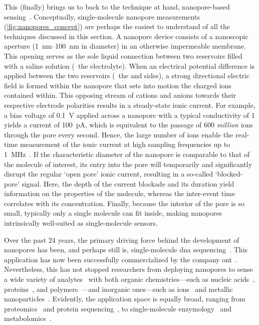 This (finally) brings us to back to the technique at hand, nanopore-based
sensing~\cite{Howorka-2009,Wang-2018}. Conceptually, single-molecule nanopore measurements
(\cref{fig:nanopores_concept}) are perhaps the easiest to understand of all the techniques discussed in this
section. A nanopore device consists of a nanoscopic aperture (\SIrange{1}{100}{\nm} in diameter) in an
otherwise impermeable membrane. This opening serves as the sole liquid connection between two reservoirs
filled with a saline solution (\ie~the electrolyte). When an electrical potential difference is applied
between the two reservoirs (\ie~the \cisi{} and \transi{} sides), a strong directional electric field is
formed within the nanopore that sets into motion the charged ions contained within. This opposing stream of
cations and anions towards their respective electrode polarities results in a steady-state ionic current. For
example, a bias voltage of \SI{0.1}{\volt} applied across a nanopore with a typical conductivity of
\SI{1}{\nS} yields a current of \SI{100}{\pA}, which is equivalent to the passage of \num{600} \emph{million}
ions through the pore every second. Hence, the large number of ions enable the real-time measurement of the
ionic current at high sampling frequencies up to \SI{1}{\mega\hertz}~\cite{Rosenstein-2012}. If the
characteristic diameter of the nanopore is comparable to that of the molecule of interest, its entry into the
pore will temporarily and significantly disrupt the regular `open pore' ionic current, resulting in a
so-called `blocked-pore' signal. Here, the depth of the current blockade and its duration yield information on
the properties of the molecule, whereas the inter-event time correlates with its concentration. Finally,
because the interior of the pore is so small, typically only a single molecule can fit inside, making
nanopores intrinsically well-suited as single-molecule sensors.

Over the past 24 years, the primary driving force behind the development of nanopores has been, and perhaps
still is, single-molecule \gls{dna} sequencing~\cite{Deamer-2016}. This application has now been successfully
commercialized by the company \gls{ont}~\cite{ONT-2020,Jain-2018}. Nevertheless, this has not stopped
researchers from deploying nanopores to sense a wide variety of analytes~\cite{Wang-2018} with both organic
chemistries---such as nucleic acids~\cite{Kasianowicz-1996,Meller-2000,Stoddart-2009,Manrao-2012},
proteins~\cite{Mohammad-2008,Firnkes-2010,Spiering-2011,RodriguezLarrea-2013}, and
polymers~\cite{Robertson-2007,Baaken-2011}---and inorganic ones---such as
ions~\cite{Bezrukov-1993,Kasianowicz-1995,Kasianowicz-1999,Ali-2011,Roozbahani-2020} and metallic
nanoparticles~\cite{Astier-2009,Angevine-2014,Campos-2018}. Evidently, the application space is equally broad,
ranging from proteomics~\cite{Yusko-2017,Houghtaling-2019} and protein
sequencing~\cite{Restrepo-Perez-2018,Huang-2019}, to single-molecule
enzymology~\cite{Willems-VanMeervelt-2017,Ho-2015,Wloka-2017,Harrington-2019,Galenkamp-2020} and
metabolomics~\cite{VanMeervelt-2017,Zernia-2020}.

